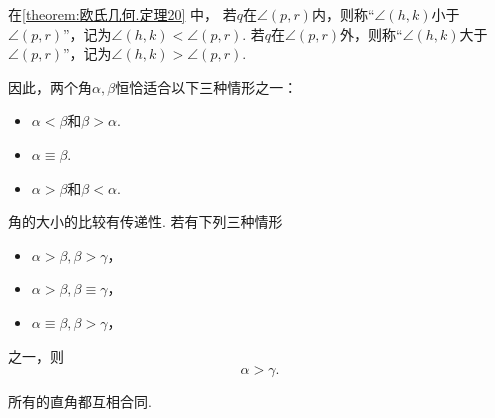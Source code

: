 \begin{figure}[ht]
	\centering
	\caption{}
	\label{figure:欧氏几何.图20}
\end{figure}

\begin{definition}
在\cref{theorem:欧氏几何.定理20} 中，
若\(q\)在\(\angle(p,r)\)内，则称“\(\angle(h,k)\)小于\(\angle(p,r)\)”，记为\(\angle(h,k) < \angle(p,r)\).
若\(q\)在\(\angle(p,r)\)外，则称“\(\angle(h,k)\)大于\(\angle(p,r)\)”，记为\(\angle(h,k) > \angle(p,r)\).
\end{definition}

因此，两个角\(\alpha,\beta\)恒恰适合以下三种情形之一：
\begin{itemize}
	\item \(\alpha<\beta\)和\(\beta>\alpha\).
	\item \(\alpha\equiv\beta\).
	\item \(\alpha>\beta\)和\(\beta<\alpha\).
\end{itemize}

角的大小的比较有传递性.
若有下列三种情形
\begin{itemize}
	\item \(\alpha>\beta,\beta>\gamma\)，
	\item \(\alpha>\beta,\beta\equiv\gamma\)，
	\item \(\alpha\equiv\beta,\beta>\gamma\)，
\end{itemize}
之一，则\[
	\alpha>\gamma.
\]

\begin{theorem}\label{theorem:欧氏几何.定理21}
所有的直角都互相合同.
\end{theorem}

